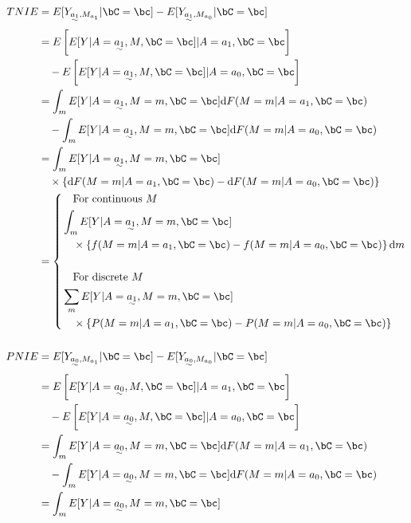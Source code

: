 \documentclass[10pt]{article}
\begin{document}
\begin{align*}
  TNIE
  &= E[Y_{\uwave{a_{1}},M_{a_{1}}} | \bC = \bc] - E[Y_{\uwave{a_{1}},M_{a_{0}}} | \bC = \bc]\\
  &=     E\left[ E[Y | A = \uwave{a_{1}}, M, \bC = \bc] | A = a_{1}, \bC = \bc \right]\\
  &~~~ - E\left[ E[Y | A = \uwave{a_{1}}, M, \bC = \bc] | A = a_{0}, \bC = \bc \right]\\
  &=     \int_{m} E[Y | A = \uwave{a_{1}}, M = m, \bC = \bc] \mathrm{d}F(M = m | A = a_{1}, \bC = \bc)\\
  &~~~ - \int_{m} E[Y | A = \uwave{a_{1}}, M = m, \bC = \bc] \mathrm{d}F(M = m | A = a_{0}, \bC = \bc)\\
  &= \int_{m} E[Y | A = \uwave{a_{1}}, M = m, \bC = \bc]\\
  &~~~ \times \left\{ \mathrm{d}F(M = m | A = a_{1}, \bC = \bc) - \mathrm{d}F(M = m | A = a_{0}, \bC = \bc) \right\}\\
  &= \left\{
  \begin{aligned}
  &~~~\text{For continuous }M\\
  &\int_{m} E[Y | A = \uwave{a_{1}}, M = m, \bC = \bc]\\
  &~~~ \times \left\{ f(M = m | A = a_{1}, \bC = \bc) - f(M = m | A = a_{0}, \bC = \bc) \right\} \mathrm{d}m\\
  &\\
  &~~~\text{For discrete }M\\
  &\sum_{m} E[Y | A = \uwave{a_{1}}, M = m, \bC = \bc]\\
  &~~~ \times \left\{ P(M = m | A = a_{1}, \bC = \bc) - P(M = m | A = a_{0}, \bC = \bc) \right\}\\
  \end{aligned}
\right .\\
  \\
  PNIE
  &= E[Y_{\uwave{a_{0}},M_{a_{1}}} | \bC = \bc] - E[Y_{\uwave{a_{0}},M_{a_{0}}} | \bC = \bc]\\
  &=     E\left[ E[Y | A = \uwave{a_{0}}, M, \bC = \bc] | A = a_{1}, \bC = \bc \right]\\
  &~~~ - E\left[ E[Y | A = \uwave{a_{0}}, M, \bC = \bc] | A = a_{0}, \bC = \bc \right]\\
  &=     \int_{m} E[Y | A = \uwave{a_{0}}, M = m, \bC = \bc] \mathrm{d}F(M = m | A = a_{1}, \bC = \bc)\\
  &~~~ - \int_{m} E[Y | A = \uwave{a_{0}}, M = m, \bC = \bc] \mathrm{d}F(M = m | A = a_{0}, \bC = \bc)\\
  &= \int_{m} E[Y | A = \uwave{a_{0}}, M = m, \bC = \bc]\\

\end{align*}
\end{document}
